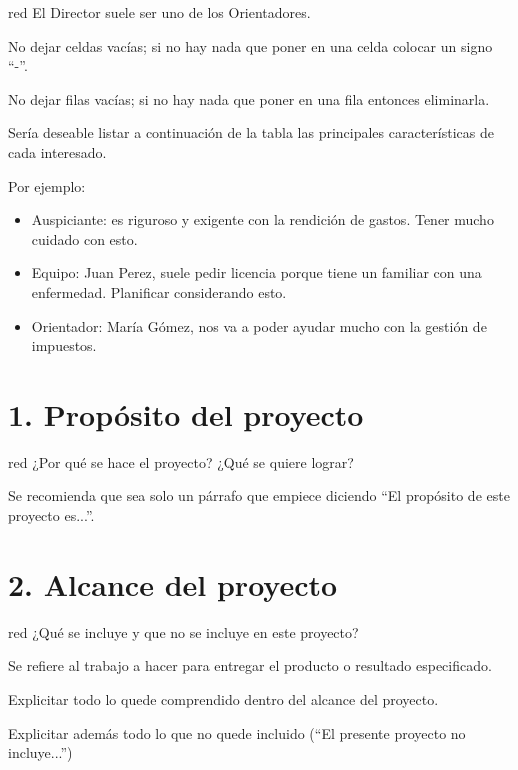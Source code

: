 \documentclass[11pt]{charter}
\begin{document}
\begin{consigna}{red}
El Director suele ser uno de los Orientadores.

No dejar celdas vacías; si no hay nada que poner en una celda colocar un signo ``-''.

No dejar filas vacías; si no hay nada que poner en una fila entonces eliminarla.

Sería deseable listar a continuación de la tabla las principales características de cada interesado.
 
Por ejemplo:
\begin{itemize}
\item Auspiciante: es riguroso y exigente con la rendición de gastos. Tener mucho cuidado con esto.
\item Equipo: Juan Perez, suele pedir licencia porque tiene un familiar con una enfermedad. Planificar considerando esto.
\item Orientador: María Gómez, nos va a poder ayudar mucho con la gestión de impuestos.
\end{itemize}

\end{consigna}



\section{1. Propósito del proyecto}
\label{sec:proposito}

\begin{consigna}{red}
¿Por qué se hace el proyecto? ¿Qué se quiere lograr? 

Se recomienda que sea solo un párrafo que empiece diciendo ``El propósito de este proyecto es...''.
\end{consigna}

\section{2. Alcance del proyecto}
\label{sec:alcance}

\begin{consigna}{red}
¿Qué se incluye y que no se incluye en este proyecto?

Se refiere al trabajo a hacer para entregar el producto o resultado especificado. 

Explicitar todo lo quede comprendido dentro del alcance del proyecto.

Explicitar además todo lo que no quede incluido (``El presente proyecto no incluye...'')

\end{consigna}
\end{document}
